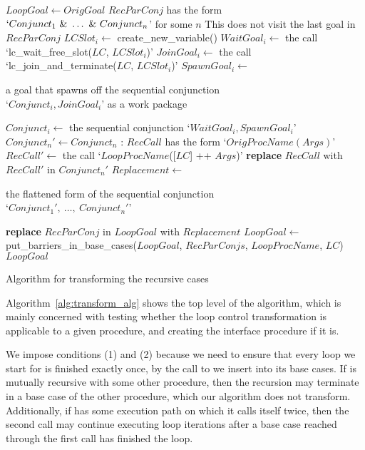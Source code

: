 \begin{algorithm}[tbp]
\begin{algorithmic}
  \State $LoopGoal \gets OrigGoal$
    \State $RecParConj$ has the form $`Conjunct_1~\&~\ldots~\&~Conjunct_n$'
        for some $n$
      \Comment This does not visit the last goal in $RecParConj$
      \State $LCSlot_i \gets$ create\_new\_variable()
      \State $WaitGoal_i \gets$ the call
        `lc\_wait\_free\_slot($LC$, $LCSlot_i$)'
      \State $JoinGoal_i \gets$ the call
        `lc\_join\_and\_terminate($LC$, $LCSlot_i$)'
      \State $SpawnGoal_i \gets$ \parbox{0.7\textwidth}{a goal
        that spawns off the sequential conjunction \\
        `$Conjunct_i, JoinGoal_i$' as a work package}
      \State $Conjunct_i \gets$ the sequential conjunction
        `$WaitGoal_i, SpawnGoal_i$'
    \EndFor
    \State $Conjunct_n' \gets Conjunct_n$
    :
      \State $RecCall$ has the form `$OrigProcName(Args)$'
      \State $RecCall' \gets$ the call
        `$LoopProcName$([$LC$] ++ $Args$)'
      \State \textbf{replace} $RecCall$ with $RecCall'$ in $Conjunct_n'$
    \EndFor
    \State $Replacement \gets$ \parbox{0.7\textwidth}{the flattened form
      of the sequential conjunction \\
      `$Conjunct_1',~\ldots,~Conjunct_n'$'}
    \State \textbf{replace} $RecParConj$ in $LoopGoal$ with $Replacement$
  \EndFor
  \State $LoopGoal \gets$ put\_barriers\_in\_base\_cases($LoopGoal$,
    $RecParConjs$, $LoopProcName$, $LC$)
  \State \Return $LoopGoal$
\EndProcedure
\end{algorithmic}
\caption{Algorithm for transforming the recursive cases}
\label{alg:reccases_alg}
\end{algorithm}

Algorithm~\ref{alg:transform_alg} shows the top level of the algorithm,
which is mainly concerned with testing
whether the loop control transformation is applicable to a given procedure,
and creating the interface procedure if it is.

We impose conditions (1) and (2) because we need to ensure
that every loop we start for  is finished exactly once,
by the call to \lcfinish we insert into its base cases.
If  is mutually recursive with some other procedure,
then the recursion may terminate in a base case of the other procedure,
which our algorithm does not transform.
Additionally, if  has some execution path on which it calls
itself twice,
then the second call may continue executing loop iterations
after a base case reached through the first call has finished the loop.

